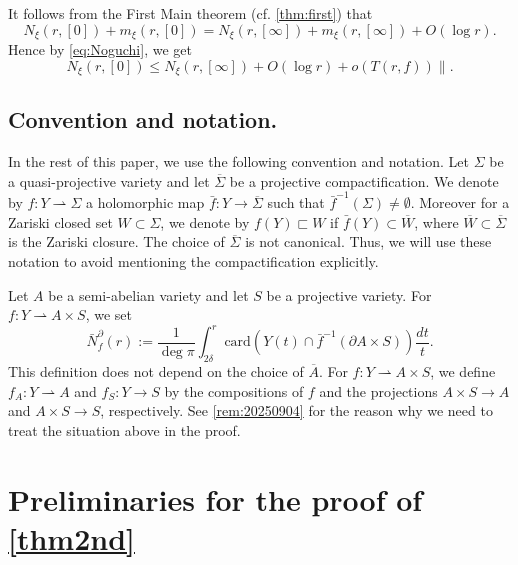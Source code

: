 \documentclass[11pt,english]{smfart}
\theoremstyle{plain}
\theoremstyle{definition}
\theoremstyle{remark}
\numberwithin{equation}{section}
\theoremstyle{plain}
\newcommand{\da}{\rightharpoonup}
\newcommand{\pN}[1]{\bar{N}_{#1}^{\partial}}
\begin{document}
It follows from the First Main theorem (cf. \cref{thm:first}) that
\begin{equation*}
 N_{\xi}(r,[0])+m_{\xi}(r,[0])=N_{\xi}(r,[\infty])+ m_{\xi}(r,[\infty])+O(\log r).
\end{equation*}
	Hence by \eqref{eq:Noguchi}, we get
	\begin{equation}\label{eq:First} 
	N_{\xi}(r,[0])\leq N_{\xi}(r,[\infty])+O(\log r)+o(T(r,f))\lVert. 
	\end{equation}
	 
	 
	 
	 

	
	\subsection*{Convention and notation.} 
	In the rest of this paper, we use the following convention and notation.
	Let $\Sigma$ be a quasi-projective variety and let $\overline{\Sigma}$ be a projective compactification.
	We denote by $f:Y\da \Sigma$ a holomorphic map $\bar{f}:Y\to \overline{\Sigma}$ such that $\bar{f}^{-1}(\Sigma)\not=\emptyset$.
	Moreover for a Zariski closed set $W\subset \Sigma$, we denote by $f(Y)\sqsubset W$ if $\bar{f}(Y)\subset \overline{W}$, where $\overline{W}\subset \overline{\Sigma}$ is the Zariski closure.
	The choice of $\overline{\Sigma}$ is not canonical. 
	Thus, we will use these notation to avoid mentioning the compactification explicitly.
	
	
	
	Let $A$ be a semi-abelian variety and let $S$ be a projective variety.
	For $f:Y\da A\times S$, we set
	$$
	\pN{f}(r):=\frac{1}{\operatorname{deg}  \pi} \int_{2\delta}^{r}\mathrm{card}\left(Y(t)\cap \bar{f}^{-1}(\partial A\times S)\right)\frac{d t}{t}.
	$$
	This definition does not depend on the choice of $\overline{A}$.
	For $f:Y\da A\times S$, we define $f_A:Y\da A$ and $f_S:Y\to S$ by the compositions of $f$ and the projections $A\times S\to A$ and $A\times S\to S$, respectively.
	See \cref{rem:20250904} for the reason why we need to treat the situation above in the proof. 
	
	
	
	
	
	
	
	
	
	
	
	\section{Preliminaries for the proof of \cref{thm2nd}}
	\label{subsec:4.2}
	
\end{document}
